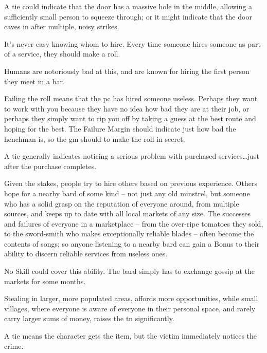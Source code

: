 \begin{multicols}{2}
A tie could indicate that the door has a massive hole in the middle, allowing a sufficiently small person to squeeze through; or it might indicate that the door caves in after multiple, noisy strikes.

It's never easy knowing whom to hire.
Every time someone hires someone as part of a service, they should make a roll.

Humans are notoriously bad at this, and are known for hiring the first person they meet in a bar.

Failing the roll means that the \gls{pc} has hired someone useless.
Perhaps they want to work with you because they have no idea how bad they are at their job, or perhaps they simply want to rip you off by taking a guess at the best route and hoping for the best.
The Failure Margin should indicate just how bad the henchman is, so the \gls{gm} should to make the roll in secret.

A tie generally indicates noticing a serious problem with purchased services\ldots just after the purchase completes.

Given the stakes, people try to hire others based on previous experience.
Others hope for a nearby bard of some kind -- not just any old minstrel, but someone who has a solid grasp on the reputation of everyone around, from multiple sources, and keeps up to date with all local markets of any size.
The successes and failures of everyone in a marketplace -- from the over-ripe tomatoes they sold, to the sword-smith who makes exceptionally reliable blades -- often become the contents of songs; so anyone listening to a nearby bard can gain a Bonus to their ability to discern reliable services from useless ones.

No Skill could cover this ability.
The bard simply has to exchange gossip at the markets for some months.

Stealing in larger, more populated areas, affords more opportunities, while small \glspl{village}, where everyone is aware of everyone in their personal space, and rarely carry larger sums of money, raises the \gls{tn} significantly.

A tie means the character gets the item, but the victim immediately notices the crime.

\larcenyChart


\end{multicols}
